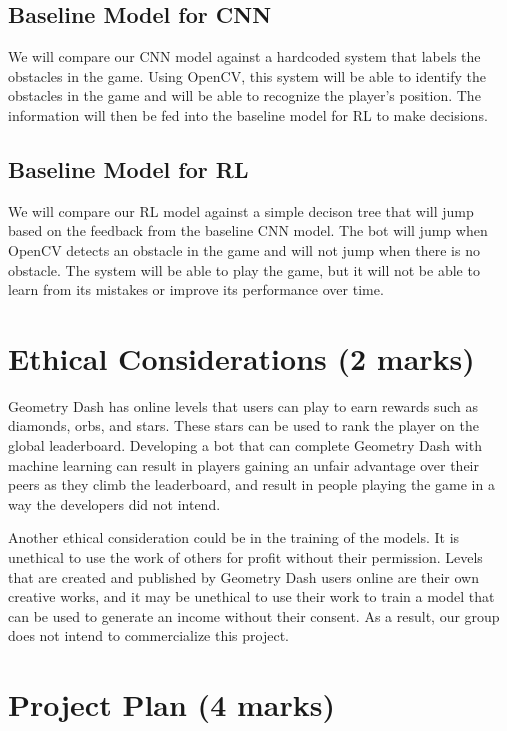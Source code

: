 \documentclass{article} %
\begin{document}
\subsection{Baseline Model for CNN}
We will compare our CNN model against a hardcoded system 
that labels the obstacles in the game. Using OpenCV, this system will
be able to identify the obstacles in the game and will 
be able to recognize the player's position. The information 
will then be fed into the baseline model for RL to make decisions.
\subsection{Baseline Model for RL}
We will compare our RL model against a simple decison tree that
will jump based on the feedback from the baseline CNN model.
The bot will jump when OpenCV detects an obstacle in the
game and will not jump when there is no obstacle. The system will 
be able to play the game, but it will not be able to learn from
its mistakes or improve its performance over time.



\section{Ethical Considerations (2 marks)}
Geometry Dash has online levels that users can play to earn rewards 
such as diamonds, orbs, and stars. These stars can be used to rank 
the player on the global leaderboard. Developing a bot that can complete 
Geometry Dash with machine learning can result in players gaining an 
unfair advantage over their peers as they climb the leaderboard, and 
result in people playing the game in a way the developers did not intend.

Another ethical consideration could be in the training of the models. 
It is unethical to use the work of others for profit without their 
permission. Levels that are created and published by Geometry Dash 
users online are their own creative works, and it may be unethical to 
use their work to train a model that can be used to generate an income 
without their consent. As a result, our group does not intend to 
commercialize this project.


\section{Project Plan (4 marks)}
\end{document}
